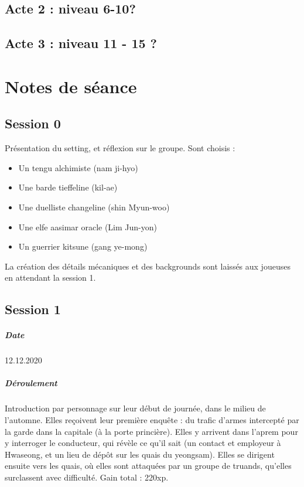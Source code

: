 \documentclass[10pt,a4paper]{book}
\begin{document}
\section{Acte 2 : niveau 6-10?}

\section{Acte 3 : niveau 11 - 15 ?}
\chapter{Notes de séance}
\section{Session 0}
Présentation du setting, et réflexion sur le groupe. Sont choisis :
\begin{itemize}
\item Un tengu alchimiste (nam ji-hyo)
\item Une barde tieffeline (kil-ae)
\item Une duelliste changeline (shin Myun-woo)
\item Une elfe aasimar oracle (Lim Jun-yon)
\item Un guerrier kitsune (gang ye-mong)
\end{itemize}
La création des détails mécaniques et des backgrounds sont laissés aux joueuses en attendant la session 1.
\section{Session 1}
\paragraph{Date}12.12.2020
\paragraph{Déroulement} Introduction par personnage sur leur début de journée, dans le milieu de l'automne. Elles reçoivent leur première enquête : du trafic d'armes intercepté par la garde dans la capitale (à la porte princière). Elles y arrivent dans l'aprem pour y interroger le conducteur, qui révèle ce qu'il sait (un contact et employeur à Hwaseong, et un lieu de dépôt sur les quais du yeongsam). Elles se dirigent ensuite vers les quais, où elles sont attaquées par un groupe de truands, qu'elles surclassent avec difficulté. Gain total : 220xp.
\end{document}
